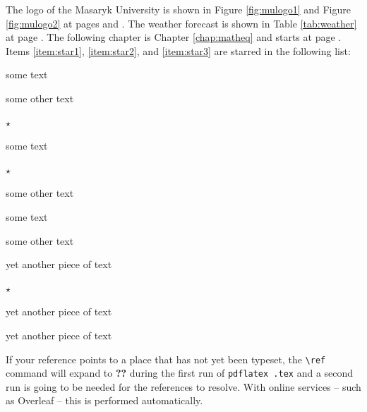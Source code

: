 \documentclass[
  digital,     %
  twoside,     %
  lof,         %
  lot,         %
]{fithesis4}
\begin{document}
The logo of the Masaryk University is shown in Figure \ref{fig:mulogo1} and
Figure \ref{fig:mulogo2} at pages \pageref{fig:mulogo1} and
\pageref{fig:mulogo2}. The weather forecast is shown in Table
\ref{tab:weather} at page \pageref{tab:weather}. The following
chapter is Chapter \ref{chap:matheq} and starts at page
\pageref{chap:matheq}.  Items \ref{item:star1}, \ref{item:star2},
and \ref{item:star3} are starred in the following list:
\begin{compactenum}
  \item some text
  \item some other text
  \item $\star$ \label{item:star1}
  \begin{compactenum}
    \item some text
    \item $\star$ \label{item:star2}
    \item some other text
    \begin{compactenum}
      \item some text
      \item some other text
      \item yet another piece of text
      \item $\star$ \label{item:star3}
    \end{compactenum}
    \item yet another piece of text
  \end{compactenum}
  \item yet another piece of text
\end{compactenum}
If your reference points to a place that has not yet been typeset,
the \verb"\ref" command will expand to \textbf{??} during the first
run of
\texttt{pdflatex \jobname.tex}
and a second run is going to be needed for the references to
resolve. With online services -- such as Overleaf -- this is
performed automatically.
\end{document}
